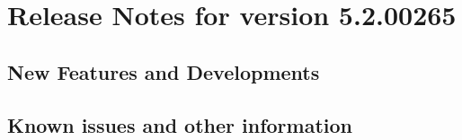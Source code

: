 \makeatletter
\section{Release Notes for version 5.2.00265}
\makeatother

\subsection{New Features and Developments}


\subsection{Known issues and other information}

